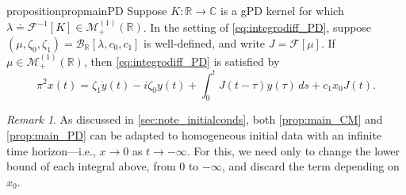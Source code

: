 \documentclass{cams-l} %
\newcommand{\CC}{\mathbb C}
\newcommand{\RR}{\mathbb R}
\newcommand{\cM}{\mathcal M}
\newcommand{\cB}{\mathcal B}
\newcommand{\cF}{\mathcal F}
\theoremstyle{definition}
\theoremstyle{remark}
\newtheorem{remark}[theorem]{Remark}
\numberwithin{equation}{section}
\begin{document}
\begin{restatable}{proposition}{propmainPD}\label{prop:main_PD} Suppose $K:\RR\to\CC$ is a gPD kernel for which $\lambda\doteq\cF^{-1}[K]\in\cM_{+}^{(1)}(\RR)$. In the setting of \ref{eq:integrodiff_PD}, suppose $(\mu,\zeta_0,\zeta_1)=\cB_\RR[\lambda,c_0,c_1]$ is well-defined, and write $J = \cF[\mu]$. If $\mu\in\cM_+^{(1)}(\RR)$, then \ref{eq:integrodiff_PD} is satisfied by
    \[\pi^{2}x(t) = \zeta_1\dot{y}(t) - i\zeta_0y(t) + \int_0^t J(t-\tau)y(\tau)\,ds + c_1x_0J(t).\]
\end{restatable}
\begin{remark}
    As discussed in \cref{sec:note_initialconds}, both \cref{prop:main_CM} and \cref{prop:main_PD} can be adapted to homogeneous initial data with an infinite time horizon---i.e., $x\to 0$ as $t\to-\infty$. For this, we need only to change the lower bound of each integral above, from $0$ to $-\infty$, and discard the term depending on $x_0$.
\end{remark}
\end{document}
